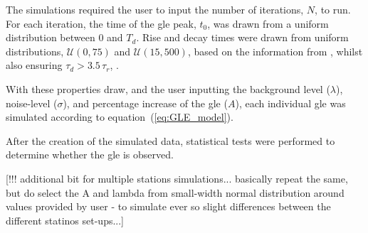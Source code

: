 The simulations required the user to input the number of iterations, $N$, to run. For each iteration, the time of the \gls{gle} peak, $t_0$, was drawn from a uniform distribution between 0 and $T_d$. Rise and decay times were drawn from uniform distributions, $\mathcal{U}(0, 75)$ and $\mathcal{U}(15, 500)$, based on the information from \citet{strauss_pulse_2017}, whilst also ensuring $\tau_d > 3.5 \, \tau_r$, \citep{strauss_pulse_2017}.

With these properties draw, and the user inputting the background level ($\lambda$), noise-level ($\sigma$), and percentage increase of the \gls{gle} ($A$), each individual \gls{gle} was simulated according to equation~(\ref{eq:GLE_model}). 

After the creation of the simulated data, statistical tests were performed to determine whether the \gls{gle} is observed.



[!!! additional bit for multiple stations simulations... basically repeat the same, but do select the A and lambda from small-width normal distribution around values provided by user - to simulate ever so slight differences between the different statinos set-ups...]
%
%
%
